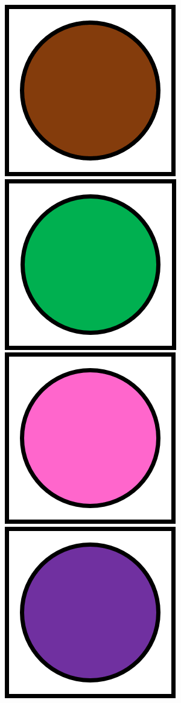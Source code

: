 \documentclass[../DocumentoOficial.tex]{subfiles}
\begin{document}
\begin{center}
\includegraphics[scale=0.65]{brownCube.png}
\includegraphics[scale=0.65]{greenCube.png}
\includegraphics[scale=0.65]{pinkCube.png}
\includegraphics[scale=0.65]{purpleCube.png}
\end{center}
\end{document}

